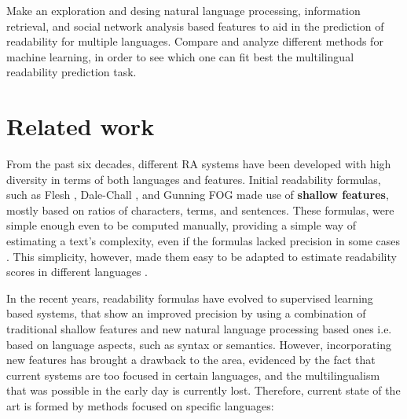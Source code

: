 \documentclass[12pt]{article}
\begin{document}
Make an exploration and desing natural language processing, information retrieval, and social network analysis based features to aid in the prediction of readability for multiple languages. Compare and analyze different methods for machine learning, in order to see which one can fit best the multilingual readability prediction task.





\section{Related work}
From the past six decades, different RA systems have been developed with high diversity in terms of both languages and features. Initial readability formulas, such as Flesh \cite{flesch1948new}, Dale-Chall \cite{chall1995readability}, and Gunning FOG \cite{albright1996readability} made use of \textbf{shallow features}, mostly based on ratios of characters, terms, and sentences. These formulas, were simple enough even to be computed manually, providing a simple way of estimating a text's complexity, even if the formulas lacked precision in some cases \cite{davison1982failure}. This simplicity, however, made them easy to be adapted to estimate readability scores in different languages \cite{spaulding1956spanish}.

In the recent years, readability formulas have evolved to supervised learning based systems, that show an improved precision by using a combination of traditional shallow features and new natural language processing based ones i.e. based on language aspects, such as syntax or semantics. However, incorporating  new features has brought a drawback to the area, evidenced by the fact that current systems are too focused in certain languages, and the multilingualism that was possible in the early day is currently lost. Therefore, current state of the art is formed by methods focused on specific languages:
\end{document}
